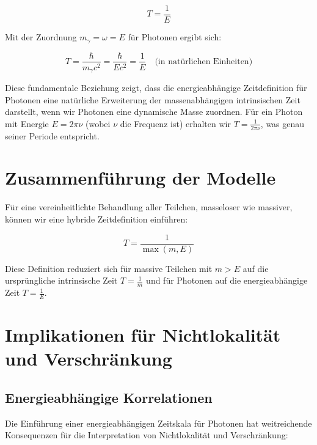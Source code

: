 \documentclass[a4paper,12pt]{article}
\begin{document}
	\begin{equation}
		T = \frac{1}{E}
	\end{equation}
	
	Mit der Zuordnung $m_{\gamma} = \omega = E$ für Photonen ergibt sich:
	
	\begin{equation}
		T = \frac{\hbar}{m_{\gamma}c^2} = \frac{\hbar}{Ec^2} = \frac{1}{E} \quad \text{(in natürlichen Einheiten)}
	\end{equation}
	
	Diese fundamentale Beziehung zeigt, dass die energieabhängige Zeitdefinition für Photonen eine natürliche Erweiterung der massenabhängigen intrinsischen Zeit darstellt, wenn wir Photonen eine dynamische Masse zuordnen. Für ein Photon mit Energie $E = 2\pi\nu$ (wobei $\nu$ die Frequenz ist) erhalten wir $T = \frac{1}{2\pi\nu}$, was genau seiner Periode entspricht.
	
	\section{Zusammenführung der Modelle}
	Für eine vereinheitlichte Behandlung aller Teilchen, masseloser wie massiver, können wir eine hybride Zeitdefinition einführen:
	
	\begin{equation}
		T = \frac{1}{\max(m, E)}
	\end{equation}
	
	Diese Definition reduziert sich für massive Teilchen mit $m > E$ auf die ursprüngliche intrinsische Zeit $T = \frac{1}{m}$ und für Photonen auf die energieabhängige Zeit $T = \frac{1}{E}$.
	
	\section{Implikationen für Nichtlokalität und Verschränkung}
	\subsection{Energieabhängige Korrelationen}
	Die Einführung einer energieabhängigen Zeitskala für Photonen hat weitreichende Konsequenzen für die Interpretation von Nichtlokalität und Verschränkung:
	
\end{document}
